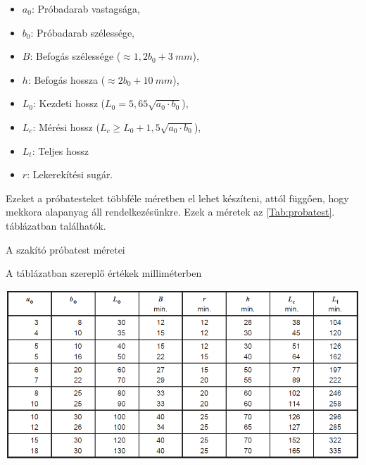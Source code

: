 \documentclass[12pt,a4paper,oneside]{report}
\begin{document}
\begin{itemize}
\item $a_0$: Próbadarab vastagsága,
\item $b_0$: Próbadarab szélessége,
\item $B$: Befogás szélessége ($\approx 1,2b_0+3\ mm$),
\item $h$: Befogás hossza ($\approx 2b_0+10\ mm$),
\item $L_0$: Kezdeti hossz ($L_0=5,65\sqrt{a_0\cdot b_0}$),
\item $L_c$: Mérési hossz ($L_c\geq L_0+1,5\sqrt{a_0\cdot b_0}$),
\item $L_t$: Teljes hossz
\item $r$: Lekerekítési sugár.
\end{itemize}
Ezeket a próbatesteket többféle méretben el lehet készíteni, attól függően, hogy mekkora alapanyag áll rendelkezésünkre. Ezek a méretek az \ref{Tab:probatest}. táblázatban találhatók.



\begin{table}[H]
\captionsetup{justification=raggedright,singlelinecheck=off}
\caption{A szakító próbatest méretei}
\vspace{-32pt}
\centering
\begin{flushright}
\begin{footnotesize}
A táblázatban szereplő értékek milliméterben
\end{footnotesize}
\end{flushright}
\vspace{-12pt}
\includegraphics[width=15cm]{tables/probatest}
\label{Tab:probatest}
\end{table}
\end{document}
